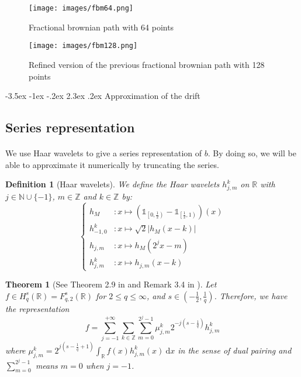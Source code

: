 \documentclass[11pt]{article}
\makeatletter
\renewcommand\section{\@startsection {section}{1}{\z@}%
    {-3.5ex \@plus -1ex \@minus -.2ex}%
    {2.3ex \@plus.2ex}%
    {\centering\large\scshape\bfseries}}
\newtheorem{defi}{Definition}
\newtheorem{theo}{Theorem}
\newcommand{\R}{\mathbb{R}}
\newcommand{\Z}{\mathbb{Z}}
\newcommand{\N}{\mathbb{N}}
\newcommand{\di}{\mathrm{d}}
\makeatother
\begin{document}
\begin{figure}
    \centering
    \texttt{[image: images/fbm64.png]}
    \caption{\label{64} Fractional brownian path with 64 points}
\end{figure}

\begin{figure}
    \centering
    \texttt{[image: images/fbm128.png]}
    \caption{\label{128} Refined version of the previous fractional brownian path with 128 points}
\end{figure}

\section{Approximation of the drift}
\subsection{Series representation}
\paragraph{}
We use Haar wavelets to give a series representation of $b$. By doing so, we will be able to approximate it numerically by truncating the series.

\begin{defi}[Haar wavelets]
    We define the Haar wavelets $h_{j,m}^k$ on $\R$ with $j\in\N\cup\{-1\}$, $m\in\Z$ and $k\in\Z$ by:
    \begin{equation}
    \begin{cases}
    h_M&:x\longmapsto\left(\mathds{1}_{\left[0,\frac{1}{2}\right)}-\mathds{1}_{\left[\frac{1}{2},1\right)}\right)(x)\\ h_{-1,0}^k&:x\longmapsto\sqrt{2}\left|h_M(x-k)\right|\\
    h_{j,m}&:x\longmapsto h_M(2^jx-m)\\
    h_{j,m}^k&:x\longmapsto h_{j,m}(x-k)
    \end{cases}
    \end{equation}
\end{defi}

\begin{theo}[See Theorem 2.9 in \cite{Tri-bas} and Remark 3.4 in \cite{Tri-fab}]\label{haar}
    Let $f\in H^s_q(\R)=F^s_{q,2}(\R)$ for $2\leq q \leq \infty$, and $s\in\left(-\frac{1}{2},\frac{1}{q}\right)$. Therefore, we have the representation
    \begin{equation}
    f = \sum_{j=-1}^{+\infty}\sum_{k\in\Z}\sum_{m=0}^{2^j-1}\mu_{j,m}^k2^{-j\left(s-\frac{1}{q}\right)}h_{j,m}^k
    \end{equation}
    where $\mu_{j,m}^k = 2^{j\left(s-\frac{1}{q}+1\right)}\int_{\R}f(x)h_{j,m}^k(x)\ \di x$ in the sense of dual pairing and $\sum_{m=0}^{2^j-1}$ means $m=0$ when $j=-1$.
\end{theo}
\end{document}
